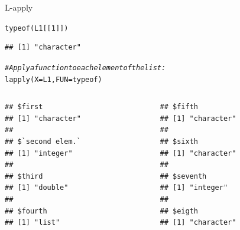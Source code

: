\documentclass[xcolor=table,       handout,    xcolor=dvipsnames]{beamer}\usepackage[]{graphicx}\usepackage[]{color}
\makeatletter
\newcommand{\hlnum}[1]{\textcolor[rgb]{0,0,0}{#1}}
\newcommand{\hlcom}[1]{\textcolor[rgb]{0,0.392,0}{\textit{#1}}}
\newcommand{\hlstd}[1]{\textcolor[rgb]{0,0,0}{#1}}
\newcommand{\hlkwc}[1]{\textcolor[rgb]{1,0,1}{#1}}
\newcommand{\hlkwd}[1]{\textcolor[rgb]{0,0,1}{#1}}
\newenvironment{kframe}{%
 \def\at@end@of@kframe{}%
 \ifinner\ifhmode%
  \def\at@end@of@kframe{\end{minipage}}%
  \begin{minipage}{\columnwidth}%
 \fi\fi%
 \def\FrameCommand##1{\hskip\@totalleftmargin \hskip-\fboxsep
 \colorbox{shadecolor}{##1}\hskip-\fboxsep
     \hskip-\linewidth \hskip-\@totalleftmargin \hskip\columnwidth}%
 \MakeFramed {\advance\hsize-\width
   \@totalleftmargin\z@ \linewidth\hsize
   \@setminipage}}%
 {\par\unskip\endMakeFramed%
 \at@end@of@kframe}
\newenvironment{knitrout}{}{} %
\makeatother
\begin{document}
\begin{frame}[fragile]{L-apply}
\vspace{-1.5em}
\begin{knitrout}
\color{fgcolor}\begin{kframe}
\begin{alltt}
\hlkwd{typeof}\hlstd{(L1[[}\hlnum{1}\hlstd{]])}
\end{alltt}
\begin{verbatim}
## [1] "character"
\end{verbatim}
\end{kframe}
\end{knitrout}
\vspace{-1.5em}
\pause
\begin{knitrout}
\color{fgcolor}\begin{kframe}
\begin{alltt}
\hlcom{# Apply a function to each element of the list:}
\hlkwd{lapply}\hlstd{(}\hlkwc{X}\hlstd{=L1,} \hlkwc{FUN}\hlstd{=typeof)}
\end{alltt}
\end{kframe}
\end{knitrout}
\pause
\vspace{-2em}
\begin{columns}
\hspace{-5em}
\begin{column}{.4\textwidth}
\begin{knitrout}
\color{fgcolor}\begin{kframe}
\begin{verbatim}
## $first
## [1] "character"
## 
## $`second elem.`
## [1] "integer"
## 
## $third
## [1] "double"
## 
## $fourth
## [1] "list"
\end{verbatim}
\end{kframe}
\end{knitrout}
\end{column}
\hspace{-7em}
\begin{column}{.4\textwidth}
\begin{knitrout}
\color{fgcolor}\begin{kframe}
\begin{verbatim}
## $fifth
## [1] "character"
## 
## $sixth
## [1] "character"
## 
## $seventh
## [1] "integer"
## 
## $eigth
## [1] "character"
\end{verbatim}
\end{kframe}
\end{knitrout}
\end{column}
\end{columns}
\end{frame}
\end{document}
